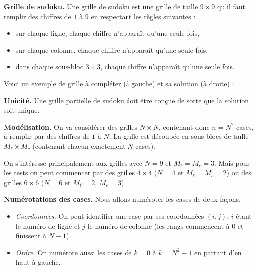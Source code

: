 \documentclass[11pt,class=report,crop=false]{standalone}
\begin{document}
\begin{cours}[Sudoku]

\textbf{Grille de sudoku.}
Une grille de sudoku est une grille de taille  $9 \times 9$ qu'il faut remplir des chiffres de $1$ à $9$ en respectant les règles suivantes :
\begin{itemize}
  \item sur chaque ligne, chaque chiffre n'apparaît qu'une seule fois,
  \item sur chaque colonne, chaque chiffre n'apparaît qu'une seule fois, 
  \item dans chaque sous-bloc $3\times 3$, chaque chiffre n'apparaît qu'une seule fois.
\end{itemize}

Voici un exemple de grille à compléter (à gauche) et sa solution (à droite) :


\medskip

\textbf{Unicité.}
Une grille partielle de sudoku doit être conçue de sorte que la solution soit unique.

\bigskip

\textbf{Modélisation.}
On va considérer des grilles $N \times N$, contenant donc $n = N^2$ cases, à remplir par des chiffres de $1$ à $N$. La grille est découpée en sous-blocs de taille $M_\ell \times M_c$ (contenant chacun exactement $N$ cases). 

On s'intéresse principalement aux grilles avec $N=9$ et $M_\ell=M_c=3$.
Mais pour les tests on peut commencer par des grilles $4 \times 4$ ($N=4$ et $M_\ell=M_c=2$) ou des grilles $6 \times 6$ ($N=6$ et $M_\ell=2$, $M_c=3$).


\bigskip

\textbf{Numérotations des cases.}
Nous allons numéroter les cases de deux façons.
\begin{itemize}	
  \item \emph{Coordonnées.} On peut identifier une case par ses coordonnées $(i,j)$, 
  $i$ étant le numéro de ligne et $j$ le numéro de colonne (les rangs commencent à $0$ et finissent à $N-1$).
  
  \item \emph{Ordre.} On numérote aussi les cases de $k=0$ à $k=N^2-1$ en partant d'en haut à gauche.

  


\end{itemize}
\end{cours}
\end{document}
